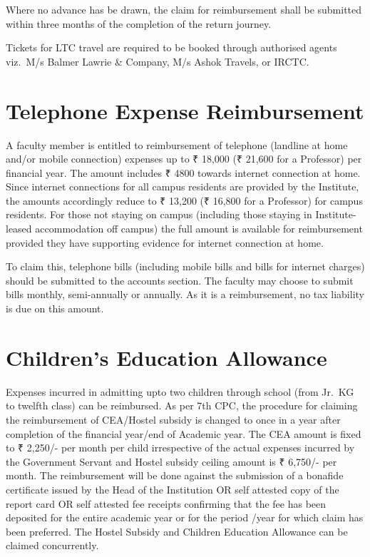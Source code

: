\documentclass[
  10pt,
  a5paper,
  10pt,
  openany]{amsbook}
\begin{document}
Where no advance has be drawn, the claim for reimbursement shall be
submitted within three months of the completion of the return journey.

Tickets for LTC travel are required to be booked through authorised
agents viz.~M/s Balmer Lawrie \& Company, M/s Ashok Travels, or IRCTC.

\section{Telephone Expense
Reimbursement}\label{telephone-expense-reimbursement}

A faculty member is entitled to reimbursement of telephone (landline at
home and/or mobile connection) expenses up to ₹ 18,000 (₹ 21,600 for a
Professor) per financial year. The amount includes ₹ 4800 towards
internet connection at home. Since internet connections for all campus
residents are provided by the Institute, the amounts accordingly reduce
to ₹ 13,200 (₹ 16,800 for a Professor) for campus residents. For those
not staying on campus (including those staying in Institute-leased
accommodation off campus) the full amount is available for reimbursement
provided they have supporting evidence for internet connection at home.

To claim this, telephone bills (including mobile bills and bills for
internet charges) should be submitted to the accounts section. The
faculty may choose to submit bills monthly, semi-annually or annually.
As it is a reimbursement, no tax liability is due on this amount.

\section{Children's Education
Allowance}\label{childrens-education-allowance}

Expenses incurred in admitting upto two children through school (from
Jr.~KG to twelfth class) can be reimbursed. As per 7th CPC, the
procedure for claiming the reimbursement of CEA/Hostel subsidy is
changed to once in a year after completion of the financial year/end of
Academic year. The CEA amount is fixed to ₹ 2,250/- per month per child
irrespective of the actual expenses incurred by the Government Servant
and Hostel subsidy ceiling amount is ₹ 6,750/- per month. The
reimbursement will be done against the submission of a bonafide
certificate issued by the Head of the Institution OR self attested copy
of the report card OR self attested fee receipts confirming that the fee
has been deposited for the entire academic year or for the period /year
for which claim has been preferred. The Hostel Subsidy and Children
Education Allowance can be claimed concurrently.
\end{document}

